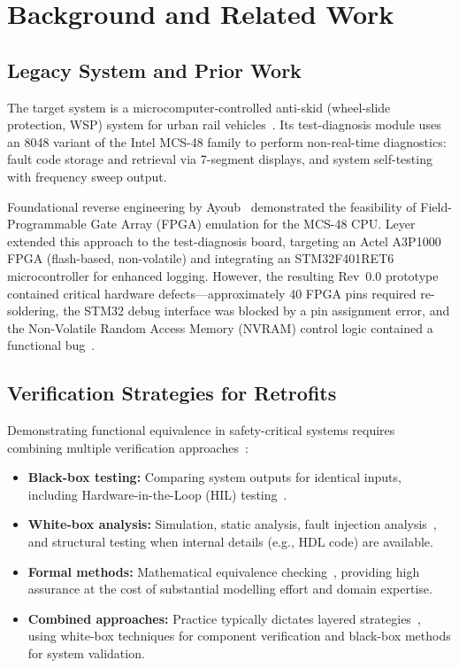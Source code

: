 \documentclass[journal, a4paper]{IEEEtran}
\newif\iffirstFPGA  \firstFPGAtrue
\newcommand{\FPGA}{\iffirstFPGA Field-Programmable Gate Array (FPGA)\global\firstFPGAfalse\else FPGA\fi}
\newif\iffirstHIL   \firstHILtrue
\newcommand{\HIL}{\iffirstHIL Hardware-in-the-Loop (HIL)\global\firstHILfalse\else HIL\fi}
\newif\iffirstNVRAM \firstNVRAMtrue
\newcommand{\NVRAM}{\iffirstNVRAM Non-Volatile Random Access Memory (NVRAM)\global\firstNVRAMfalse\else NVRAM\fi}
\begin{document}
\section{Background and Related Work}
\label{sec:background}

\subsection{Legacy System and Prior Work}
The target system is a microcomputer-controlled anti-skid (wheel-slide protection, WSP) system for urban rail vehicles~\cite{rexroth1992wsp}. Its test-diagnosis module uses an 8048 variant of the Intel MCS-48 family to perform non-real-time diagnostics: fault code storage and retrieval via 7-segment displays, and system self-testing with frequency sweep output.

Foundational reverse engineering by Ayoub~\cite{ayoub2014} demonstrated the feasibility of \FPGA{} emulation for the MCS-48 CPU. Leyer~\cite{leyer2023} extended this approach to the test-diagnosis board, targeting an Actel A3P1000 \FPGA{} (flash-based, non-volatile) and integrating an STM32F401RET6 microcontroller for enhanced logging. However, the resulting Rev~0.0 prototype contained critical hardware defects---approximately 40 \FPGA{} pins required re-soldering, the STM32 debug interface was blocked by a pin assignment error, and the \NVRAM{} control logic contained a functional bug~\cite{savchuk2025}.

\subsection{Verification Strategies for Retrofits}
Demonstrating functional equivalence in safety-critical systems requires combining multiple verification approaches~\cite{bozzano2016formal,ammann2016introduction}:
\begin{itemize}[nosep]
  \item \textbf{Black-box testing:} Comparing system outputs for identical inputs, including \HIL{} testing~\cite{hil_rail_suspension_2023,zhou_wu_2020}.
  \item \textbf{White-box analysis:} Simulation, static analysis, fault injection analysis~\cite{ziade2004faultinjection}, and structural testing when internal details (e.g., HDL code) are available.
  \item \textbf{Formal methods:} Mathematical equivalence checking~\cite{formal_verification_rail_2023}, providing high assurance at the cost of substantial modelling effort and domain expertise.
  \item \textbf{Combined approaches:} Practice typically dictates layered strategies~\cite{scheithauer2018safety,hierons2009using}, using white-box techniques for component verification and black-box methods for system validation.
\end{itemize}
\end{document}
